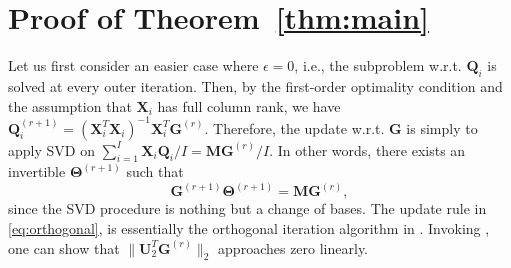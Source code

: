 \documentclass[10pt,journal]{IEEEtran}
\newcommand{\G}{\boldsymbol{G}}
\newcommand{\Q}{\boldsymbol{Q}}
\begin{document}
\section{Proof of Theorem~\ref{thm:main}}
Let us first consider an easier case where $\epsilon=0$, i.e., the subproblem w.r.t. ${\bm Q}_i$ is solved at every outer iteration.
Then, by the first-order optimality condition and the assumption that ${\bm X}_i$ has full column rank, we have
${\bm Q}_i^{(r+1)}=({\bm X}_i^T{\bm X}_i)^{-1}{\bm X}_i^T{\bm G}^{(r)}.$
Therefore, the update w.r.t. ${\bm G}$ is simply
to apply SVD on $\sum_{i=1}^I{\bm X}_i{\Q_i}/I = {\bm M}{\bm G}^{(r)}/I$.
In other words, there exists an invertible ${\bm \Theta}^{(r+1)}$ such that
\begin{equation}\label{eq:orthogonal}
  {\bm G}^{(r+1)}{\bm \Theta}^{(r+1)} = {\bm M}{\bm G}^{(r)},
\end{equation}
since the SVD procedure is nothing but a change of bases.
The update rule in \eqref{eq:orthogonal}, is essentially the orthogonal iteration algorithm in \cite{GHGolub1996}.
Invoking \cite[Theorem 8.2.2]{GHGolub1996}, one can show that $\|{\bm U}_2^T{\bm G}^{(r)}\|_2$ approaches zero linearly.
\end{document}
